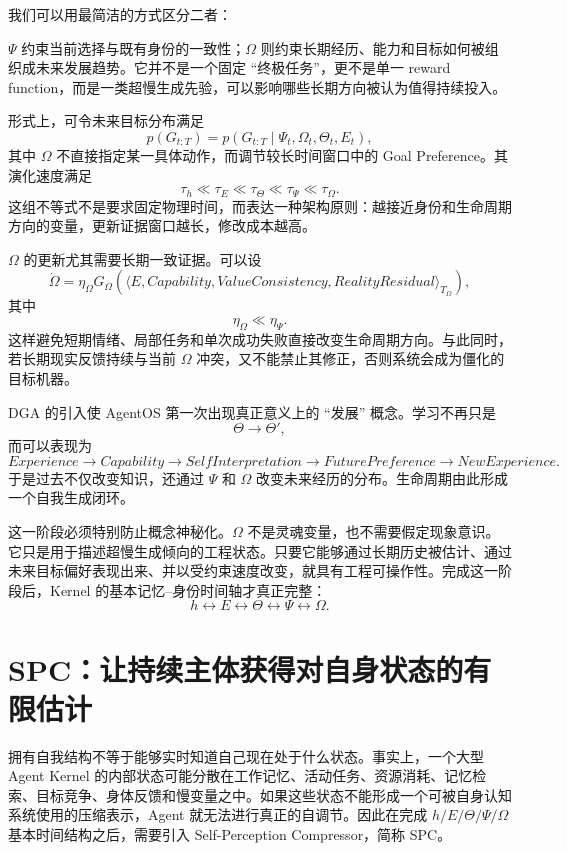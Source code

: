 我们可以用最简洁的方式区分二者：
\begin{statementbox}
\centering
{}
\end{statementbox}
$\Psi$ 约束当前选择与既有身份的一致性；$\Omega$ 则约束长期经历、能力和目标如何被组织成未来发展趋势。它并不是一个固定 ``终极任务''，更不是单一 reward function，而是一类超慢生成先验，可以影响哪些长期方向被认为值得持续投入。

形式上，可令未来目标分布满足
\[
p(G_{t:T})
=
p(G_{t:T}\mid
\Psi_t,\Omega_t,\Theta_t,E_t),
\]
其中 $\Omega$ 不直接指定某一具体动作，而调节较长时间窗口中的 Goal Preference。其演化速度满足
\[
\tau_h
\ll
\tau_E
\ll
\tau_\Theta
\ll
\tau_\Psi
\ll
\tau_\Omega.
\]
这组不等式不是要求固定物理时间，而表达一种架构原则：越接近身份和生命周期方向的变量，更新证据窗口越长，修改成本越高。

$\Omega$ 的更新尤其需要长期一致证据。可以设
\[
\dot\Omega
=
\eta_\Omega
G_\Omega
\left(
\langle
E,
Capability,
ValueConsistency,
RealityResidual
\rangle_{T_\Omega}
\right),
\]
其中
\[
\eta_\Omega\ll\eta_\Psi.
\]
这样避免短期情绪、局部任务和单次成功失败直接改变生命周期方向。与此同时，若长期现实反馈持续与当前 $\Omega$ 冲突，又不能禁止其修正，否则系统会成为僵化的目标机器。

DGA 的引入使 AgentOS 第一次出现真正意义上的 ``发展'' 概念。学习不再只是
\[
\Theta\rightarrow\Theta',
\]
而可以表现为
\[
Experience
\rightarrow
Capability
\rightarrow
SelfInterpretation
\rightarrow
FuturePreference
\rightarrow
NewExperience.
\]
于是过去不仅改变知识，还通过 $\Psi$ 和 $\Omega$ 改变未来经历的分布。生命周期由此形成一个自我生成闭环。

这一阶段必须特别防止概念神秘化。$\Omega$ 不是灵魂变量，也不需要假定现象意识。它只是用于描述超慢生成倾向的工程状态。只要它能够通过长期历史被估计、通过未来目标偏好表现出来、并以受约束速度改变，就具有工程可操作性。完成这一阶段后，Kernel 的基本记忆--身份时间轴才真正完整：
\[
h
\leftrightarrow
E
\leftrightarrow
\Theta
\leftrightarrow
\Psi
\leftrightarrow
\Omega.
\]

\section{SPC：让持续主体获得对自身状态的有限估计}

拥有自我结构不等于能够实时知道自己现在处于什么状态。事实上，一个大型 Agent Kernel 的内部状态可能分散在工作记忆、活动任务、资源消耗、记忆检索、目标竞争、身体反馈和慢变量之中。如果这些状态不能形成一个可被自身认知系统使用的压缩表示，Agent 就无法进行真正的自调节。因此在完成 $h/E/\Theta/\Psi/\Omega$ 基本时间结构之后，需要引入 Self-Perception Compressor，简称 SPC。

